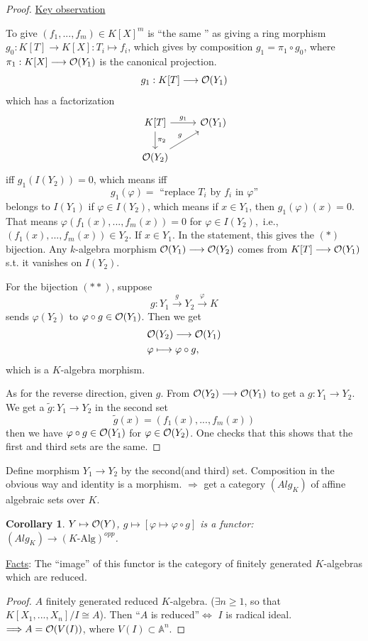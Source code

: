 \documentclass[11pt]{article}
\newtheorem{cor}[thm]{Corollary}
\newcommand{\affn}{\mathbb A}
\newcommand{\calo}{{\cal O}}
\newcommand{\Lrta}{\Longrightarrow}
\newcommand{\lrta}{\longrightarrow}
\newcommand{\Llrta}{\Longleftrightarrow}
\begin{document}
\begin{proof}
\underline{Key observation}

To give $(f_1,...,f_m)\in K[X]^m$ is ``the same '' as giving a ring morphism $g_0:K[T]\lrta K[X]: T_i\mapsto f_i$, which gives by composition $g_1=\pi_1\circ g_0$, where $\pi_1: K[X]\lrta \calo(Y_1)$ is the canonical projection.
$$
g_1: K[T]\lrta \calo(Y_1)
$$
which has a factorization
\[
\begin{tikzcd}
K[T] \arrow[r,"g_1"] \arrow[d,"\pi_2"]  & \calo(Y_1)  \\
   \calo(Y_2) \arrow[ur,"g"] & 
\end{tikzcd}
\]
iff $g_1(I(Y_2))=0$, which means iff 
$$
g_1(\varphi)=\text{ ``replace $T_i$ by $f_i$ in $\varphi$''}
$$
belongs to $I(Y_1)$ if $\varphi\in I(Y_2)$, which means if $x\in Y_1$, then $g_1(\varphi)(x)=0$. That means $\varphi(f_1(x),...,f_m(x))=0$ for $\varphi\in I(Y_2),$ i.e., $(f_1(x),...,f_m(x))\in Y_2$. If $x\in Y_1$. In the statement, this gives the $(*)$ bijection. Any $k$-algebra morphism $\calo(Y_1)\lrta\calo(Y_2)$  comes from $K[T]\lrta \calo(Y_1)$ s.t. it vanishes on $I(Y_2)$.


For the bijection $(**)$, suppose 
$$
g:Y_1\overset{g}{\lrta} Y_2\overset{\varphi}{\lrta} K
$$
sends $\varphi(Y_2)$ to $\varphi\circ g\in\calo(Y_1)$. Then we get 
$$
\begin{aligned}
& \calo(Y_2)\lrta \calo(Y_1)\\
&\varphi\longmapsto \varphi\circ g,
\end{aligned}
$$
which is a $K$-algebra morphism.

As for the reverse direction, given $g$. From $\calo(Y_2)\lrta \calo(Y_1)$ to get a $g:Y_1\lrta Y_2$. We get a $\tilde{g}:Y_1\lrta Y_2$ in the second set
$$
\tilde{g}(x)=(f_1(x),...,f_m(x))
$$
then we have $\varphi\circ g\in\calo(Y_1)$ for $\varphi\in \calo(Y_2)$. One checks that this shows that the first and third sets are the same.
\end{proof}

Define morphism $Y_1\lrta Y_2$ by the second(and third) set.  Composition in the obvious way and identity is a morphism.
$\Lrta$ get a category $(Alg_K)$ of affine algebraic sets over $K$.

\begin{cor}
$Y\mapsto \calo(Y)$, $g\mapsto [\varphi\mapsto \varphi\circ g]$ is a functor: $(Alg_K)\lrta (K\text{-Alg})^{opp}$.
\end{cor}

\underline{Facts}: The ``image'' of this functor is the category of finitely generated $K$-algebras which are reduced.
\begin{proof}
$A$ finitely generated reduced $K$-algebra. ($\exists n\geq 1$, so that $K[X_1,...,X_n]/I\cong A$). Then ``$A$ is reduced''$\Llrta$ $I$ is radical ideal.
$\Lrta A=\calo(V(I))$, where $V(I)\subset \affn^n$.
\end{proof}
\end{document}
